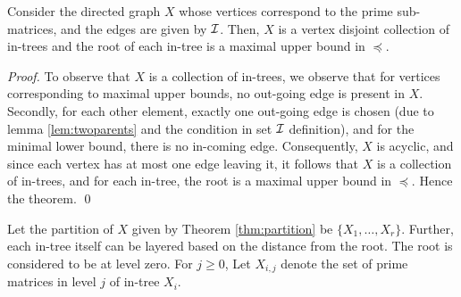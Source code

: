 \documentclass{llncs}
\def\cI{{\cal I}}
\begin{document}
\begin{theorem} \label{thm:partition} Consider the directed graph $X$
  whose vertices correspond to the prime sub-matrices, and the edges
  are given by $\cI$.  Then, $X$ is a vertex disjoint collection of
  in-trees and the root of each in-tree is a maximal upper bound in
  $\preccurlyeq$.
\end{theorem}
\begin{proof}
To observe that $X$ is a collection of in-trees, we observe that for         
vertices corresponding to maximal upper bounds, no out-going edge is
present in $X$.  Secondly, for each other element, exactly one
out-going edge is chosen (due to lemma \ref{lem:twoparents} and the
condition in set $\cI$ definition), and for the 
minimal lower bound, there is no in-coming edge.  Consequently, $X$ is
acyclic, and since each vertex has at most one edge leaving it, it
follows that $X$ is a collection of in-trees, and for each in-tree,
the root is a maximal upper bound in $\preccurlyeq$.  Hence the
theorem. \qed
\end{proof}
Let the partition of $X$ given by Theorem \ref{thm:partition} be
$\{X_1,\ldots,X_r\}$.  Further, each in-tree itself  
can be layered based on the distance from the root.  The root is
considered to be at level zero. For $j \geq 0$, Let $X_{i,j}$ denote
the set of prime matrices in level $j$ of in-tree $X_i$.   
\end{document}
